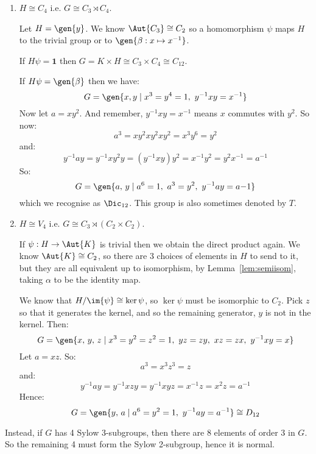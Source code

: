 \begin{enumerate}
    \item \(H \cong C_4\) i.e. \(G \cong C_3 \rtimes C_4\).

        Let \(H = \gen{y}\).
        We know \(\Aut{C_3} \cong C_2\) so a homomorphism \(\psi\) maps \(H\) to the trivial group or to \(\gen{\beta:x
        \mapsto x^{-1}}\).

        If \(H\psi = \bm{1}\) then \(G = K \times H \cong C_3 \times C_4 \cong C_{12}\).

        If \(H\psi = \gen{\beta}\) then we have:
        \[G = \gen{x, y \mid x^3 = y^4 = 1,\ y^{-1}xy = x^{-1}}\]
        Now let \(a = xy^2\).
        And remember, \(y^{-1}xy = x^{-1}\) means \(x\) commutes with \(y^2\).
        So now:
        \[a^3 = xy^2xy^2xy^2 = x^3y^6 = y^2\]
        and:
        \[y^{-1}ay = y^{-1}xy^2y = (y^{-1}xy)y^2 = x^{-1}y^2 = y^2x^{-1} = a^{-1}\]
        So:
        \[G = \gen{a,\,y \mid a^6 = 1,\ a^3 = y^2,\ y^{-1}ay = a{-1}}\]
        which we recognise as \(\Dic_{12}\).
        This group is also sometimes denoted by \(T\).
    \item \(H \cong V_4\) i.e. \(G \cong C_3 \rtimes (C_2 \times C_2)\).

        If \(\psi:H \to \Aut{K}\) is trivial then we obtain the direct product again.
        We know \(\Aut{K} \cong C_2\), so there are 3 choices of elements in \(H\) to send to it, but they are all
        equivalent up to isomorphism, by Lemma~\ref{lem:semiisom}, taking \(\alpha\) to be the identity map.

        We know that \(H / \im{\psi} \cong \ker{\psi}\), so \(\ker{\psi}\) must be isomorphic to \(C_2\).
        Pick \(z\) so that it generates the kernel, and so the remaining generator, \(y\) is not in the kernel.
        Then:
        \[G = \gen{x,\,y,\,z \mid x^3 = y^2 = z^2 = 1,\ yz = zy,\ xz = zx,\ y^{-1}xy = x}\]
        Let \(a = xz\).
        So:
        \[a^3 = x^3z^3 = z\]
        and:
        \[ y^{-1}ay = y^{-1}xzy = y^{-1}xyz = x^{-1}z = x^2z = a^{-1}\]
        Hence:
        \[G = \gen{y,\,a \mid a^6 = y^2 = 1,\ y^{-1}ay = a^{-1}} \cong D_{12}\]
\end{enumerate}

Instead, if \(G\) has 4 Sylow 3-subgroups, then there are 8 elements of order 3 in \(G\).
So the remaining 4 must form the Sylow 2-subgroup, hence it is normal.

